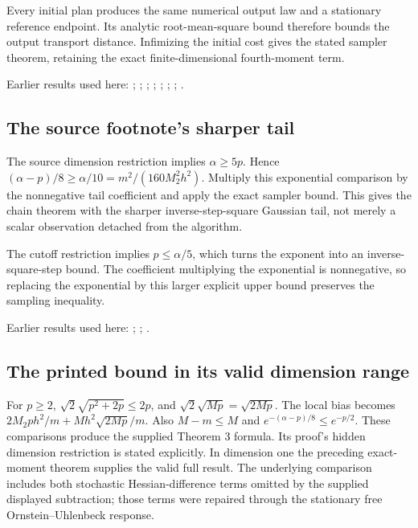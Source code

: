\documentclass[11pt,a4paper]{report}
\begin{document}
Every initial plan produces the same numerical output law and a stationary reference endpoint. Its analytic root-mean-square bound therefore bounds the output transport distance. Infimizing the initial cost gives the stated sampler theorem, retaining the exact finite-dimensional fourth-moment term.



Earlier results used here: \cite[Section~3.17.13]{LangevinLean2026ULASC}; \cite[Section~3.17.2]{LangevinLean2026ULASC}; \cite[Section~3.17.3]{LangevinLean2026ULASC}; \cite[Section~3.17.4]{LangevinLean2026ULASC}; \cite[Section~3.18.4]{LangevinLean2026ULASC}; \cite[Section~3.26.13]{LangevinLean2026ULASC}; \cite[Section~3.26.15]{LangevinLean2026ULASC}; \cite[Section~3.26.3]{LangevinLean2026ULASC}.
\subsection{\texorpdfstring{The source footnote’s sharper tail}{The source footnote’s sharper tail}}
\label{report-step-KineticLangevin-CanonicalKLMC2-lean-2}


The source dimension restriction implies \(\alpha\ge5p\). Hence \((\alpha-p)/8\ge\alpha/10=m^2/(160M_2^2h^2)\). Multiply this exponential comparison by the nonnegative tail coefficient and apply the exact sampler bound. This gives the chain theorem with the sharper inverse-step-square Gaussian tail, not merely a scalar observation detached from the algorithm.



The cutoff restriction implies \(p\le\alpha/5\), which turns the exponent into an inverse-square-step bound. The coefficient multiplying the exponential is nonnegative, so replacing the exponential by this larger explicit upper bound preserves the sampling inequality.



Earlier results used here: \cite[Section~3.17.3]{LangevinLean2026ULASC}; \cite[Section~3.17.4]{LangevinLean2026ULASC}; \cite[Section~3.26.3]{LangevinLean2026ULASC}.
\subsection{\texorpdfstring{The printed bound in its valid dimension range}{The printed bound in its valid dimension range}}
\label{report-step-KineticLangevin-CanonicalKLMC2-lean-3}


For \(p\ge2\), \(\sqrt2\sqrt{p^2+2p}\le2p\), and \(\sqrt2\sqrt{Mp}=\sqrt{2Mp}\). The local bias becomes \(2M_2ph^2/m+Mh^2\sqrt{2Mp}/m\). Also \(M-m\le M\) and \(e^{-(\alpha-p)/8}\le e^{-p/2}\). These comparisons produce the supplied Theorem 3 formula. Its proof’s hidden dimension restriction is stated explicitly. In dimension one the preceding exact-moment theorem supplies the valid full result. The underlying comparison includes both stochastic Hessian-difference terms omitted by the supplied displayed subtraction; those terms were repaired through the stationary free Ornstein–Uhlenbeck response.
\end{document}
